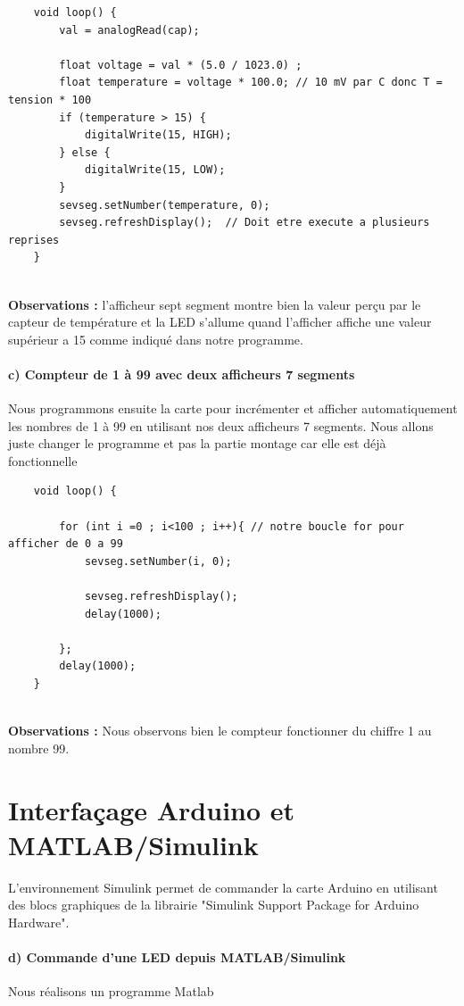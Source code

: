\begin{lstlisting}
	void loop() {
		val = analogRead(cap);
		
		float voltage = val * (5.0 / 1023.0) ;
		float temperature = voltage * 100.0; // 10 mV par C donc T = tension * 100
		if (temperature > 15) {
			digitalWrite(15, HIGH);
		} else {
			digitalWrite(15, LOW);
		}
		sevseg.setNumber(temperature, 0);
		sevseg.refreshDisplay();  // Doit etre execute a plusieurs reprises
	}
	
\end{lstlisting}

\textbf{Observations :} l'afficheur sept segment montre bien la valeur perçu par le capteur de température et la LED s'allume quand l'afficher affiche une valeur supérieur a 15 comme indiqué dans notre programme.

\paragraph{c) Compteur de 1 à 99 avec deux afficheurs 7 segments}
Nous programmons ensuite la carte pour incrémenter et afficher automatiquement les nombres de 1 à 99 en utilisant nos deux afficheurs 7 segments. Nous allons juste changer le programme et pas la partie montage car elle est déjà fonctionnelle

\begin{lstlisting}
	void loop() {
		
		for (int i =0 ; i<100 ; i++){ // notre boucle for pour afficher de 0 a 99
			sevseg.setNumber(i, 0);
			
			sevseg.refreshDisplay(); 
			delay(1000);
			
		};
		delay(1000);
	}
	
\end{lstlisting}

\textbf{Observations :} Nous observons bien le compteur fonctionner du chiffre 1 au nombre 99.

\section{Interfaçage Arduino et MATLAB/Simulink}
L'environnement Simulink permet de commander la carte Arduino en utilisant des blocs graphiques de la librairie "Simulink Support Package for Arduino Hardware".

\paragraph{d) Commande d'une LED depuis MATLAB/Simulink}
Nous réalisons un programme Matlab 

